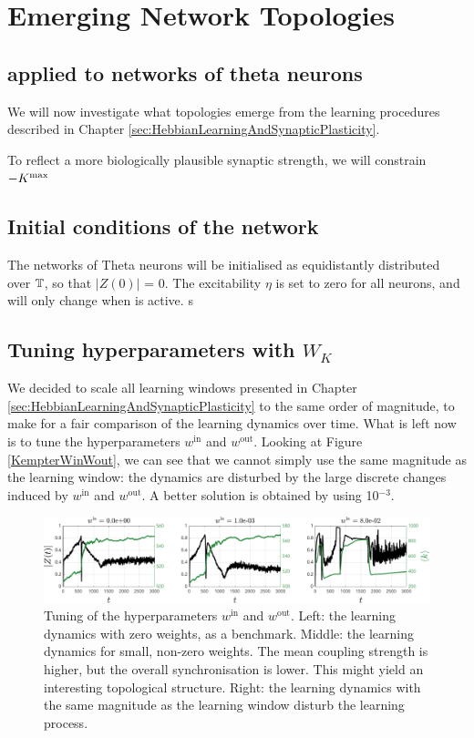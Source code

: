 \newpage
\section{\mywork Emerging Network Topologies}
\subsection{\STDP applied to networks of theta neurons}

We will now investigate what topologies emerge from the learning procedures described in Chapter \ref{sec:HebbianLearningAndSynapticPlasticity}.

To reflect a more biologically plausible synaptic strength, we will constrain $-K^{\rm max}$

\subsection{Initial conditions of the network}
The networks of Theta neurons will be initialised as equidistantly distributed over ${\mathbb{T}}$, so that $| Z(0) |$ = 0. The excitability $\eta$ is set to zero for all neurons, and will only change when \IP is active. s

\subsection{Tuning hyperparameters with \texorpdfstring{$W_K$}{TEXT}}
We decided to scale all learning windows presented in Chapter \ref{sec:HebbianLearningAndSynapticPlasticity} to the same order of magnitude, to make for a fair comparison of the learning dynamics over time. What is left now is to tune the hyperparameters $w^{\mathrm{in}}$ and $w^{\mathrm{out}}$. Looking at Figure \ref{KempterWinWout}, we can see that we cannot simply use the same magnitude as the learning window: the dynamics are disturbed by the large discrete changes induced by $w^{\mathrm{in}}$ and $w^{\mathrm{out}}$. A better solution is obtained by using 10$^{-3}$.

\begin{figure}[H]
\centering
\includegraphics[width = \textwidth]{../Figures/Learning/KempterWinWout.pdf}
\caption{Tuning of the hyperparameters $w^{\mathrm{in}}$ and $w^{\mathrm{out}}$. Left: the learning dynamics with zero weights, as a benchmark. Middle: the learning dynamics for small, non-zero weights. The mean coupling strength is higher, but the overall synchronisation is lower. This might yield an interesting topological structure. Right: the learning dynamics with the same magnitude as the learning window disturb the learning process.}
\label{fig:KempterWinWout}
\end{figure}


